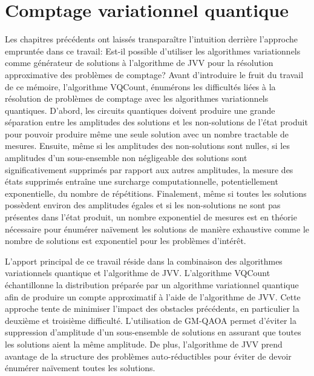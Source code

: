 \chapter{Comptage variationnel quantique}
\label{cha:comptage-variationnel-quantique}


\begin{comment}
\subsection*{Plan}

\begin{enumerate}
    \item Expliquer que cette section ne concerne que GM-QAOA
\end{enumerate}
\end{comment}

Les chapitres précédents ont laissés transparaître l'intuition derrière l'approche empruntée dans ce travail: Est-il possible d'utiliser les algorithmes variationnels comme générateur de solutions à l'algorithme de JVV pour la résolution approximative des problèmes de comptage? Avant d'introduire le fruit du travail de ce mémoire, l'algorithme VQCount, énumérons les difficultés liées à la résolution de problèmes de comptage avec les algorithmes variationnels quantiques. D'abord, les circuits quantiques doivent produire une grande séparation entre les amplitudes des solutions et les non-solutions de l'état produit pour pouvoir produire même une seule solution avec un nombre tractable de mesures. Ensuite, même si les amplitudes des non-solutions sont nulles, si les amplitudes d'un sous-ensemble non négligeable des solutions sont significativement supprimés par rapport aux autres amplitudes, la mesure des états supprimés entraîne une surcharge computationnelle, potentiellement exponentielle, du nombre de répétitions. Finalement, même si toutes les solutions possèdent environ des amplitudes égales et si les non-solutions ne sont pas présentes dans l'état produit, un nombre exponentiel de mesures est en théorie nécessaire pour énumérer naïvement les solutions de manière exhaustive comme le nombre de solutions est exponentiel pour les problèmes d'intérêt.

L'apport principal de ce travail réside dans la combinaison des algorithmes variationnels quantique et l'algorithme de JVV. L'algorithme VQCount échantillonne la distribution préparée par un algorithme variationnel quantique afin de produire un compte approximatif à l'aide de l'algorithme de JVV. Cette approche tente de minimiser l'impact des obstacles précédents, en particulier la deuxième et troisième difficulté. L'utilisation de GM-QAOA permet d'éviter la suppression d'amplitude d'un sous-ensemble de solutions en assurant que toutes les solutions aient la même amplitude. De plus, l'algorithme de JVV prend avantage de la structure des problèmes auto-réductibles pour éviter de devoir énumérer naïvement toutes les solutions. 

